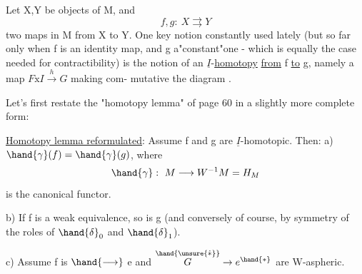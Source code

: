 Let X,Y be objects of M,  and 
\[ f,g:\ X\rightrightarrows Y \]
two maps in M from X to Y. One key notion constantly used lately (but so
far only when f is an identity map,  and g a"constant"one  -  which is
equally the case needed for   contractibility) is the notion
of an $\underline{I}$-\uline{homotopy}  \uline{from} f \uline{to} g,  namely a map $F\mathrm{x}I\xrightarrow{h}G$  making com-%
mutative the diagram
 .

Let's first restate the "homotopy lemma" of page 60 in a slightly more
complete form:

\uline{Homotopy lemma reformulated}:  Assume f and g are $\underline{I}$-homotopic.  Then:
a) $\hand{\gamma}(f)=\hand{\gamma}(g)$,  where
\[ \hand{\gamma}:\ M\longrightarrow W^{-1}M = H_{M} \]
is the canonical functor.

b) If  f  is a weak equivalence,  so is g  (and conversely of course,
by symmetry of the roles of $\hand{\delta}_0$ and $\hand{\delta}_1$).

c) Assume f is   $\hand{\longrightarrow}$ e  and
$\overset{\hand{\unsure{\hat{\ast}}}}{G}\rightarrow e^{\hand{\ast}}$  are W-aspheric.

